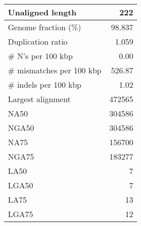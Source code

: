 \documentclass[12pt,a4paper]{article}
\begin{document}
\begin{table}[ht]
\begin{center}
\begin{tabular}{|l*{1}{|r}|}
Unaligned length & 222 \\ \hline
Genome fraction (\%) & 98.837 \\ \hline
Duplication ratio & 1.059 \\ \hline
\# N's per 100 kbp & 0.00 \\ \hline
\# mismatches per 100 kbp & 526.87 \\ \hline
\# indels per 100 kbp & 1.02 \\ \hline
Largest alignment & 472565 \\ \hline
NA50 & 304586 \\ \hline
NGA50 & 304586 \\ \hline
NA75 & 156700 \\ \hline
NGA75 & 183277 \\ \hline
LA50 & 7 \\ \hline
LGA50 & 7 \\ \hline
LA75 & 13 \\ \hline
LGA75 & 12 \\ \hline
\end{tabular}
\end{center}
\end{table}
\end{document}
